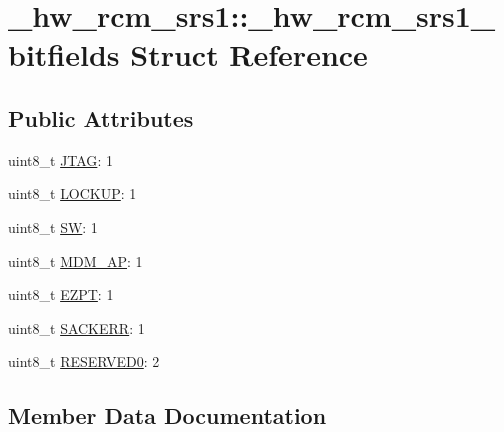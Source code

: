 \hypertarget{struct__hw__rcm__srs1_1_1__hw__rcm__srs1__bitfields}{}\section{\+\_\+hw\+\_\+rcm\+\_\+srs1\+:\+:\+\_\+hw\+\_\+rcm\+\_\+srs1\+\_\+bitfields Struct Reference}
\label{struct__hw__rcm__srs1_1_1__hw__rcm__srs1__bitfields}
\subsection*{Public Attributes}
\begin{DoxyCompactItemize}
\item 
uint8\+\_\+t \hyperlink{struct__hw__rcm__srs1_1_1__hw__rcm__srs1__bitfields_a8804b5c3226e9d934b9993793832d907}{J\+T\+AG}\+: 1
\item 
uint8\+\_\+t \hyperlink{struct__hw__rcm__srs1_1_1__hw__rcm__srs1__bitfields_a63712712ce5d3199b675a6382d48a22b}{L\+O\+C\+K\+UP}\+: 1
\item 
uint8\+\_\+t \hyperlink{struct__hw__rcm__srs1_1_1__hw__rcm__srs1__bitfields_ac8ebd31fe8ce4a05372eb5c9d12124f3}{SW}\+: 1
\item 
uint8\+\_\+t \hyperlink{struct__hw__rcm__srs1_1_1__hw__rcm__srs1__bitfields_aeb4e3db6add5d45ac6194c7bd1617d14}{M\+D\+M\+\_\+\+AP}\+: 1
\item 
uint8\+\_\+t \hyperlink{struct__hw__rcm__srs1_1_1__hw__rcm__srs1__bitfields_a71553c5e402eeb08470ff3e3bf4f08b7}{E\+Z\+PT}\+: 1
\item 
uint8\+\_\+t \hyperlink{struct__hw__rcm__srs1_1_1__hw__rcm__srs1__bitfields_abd4ea56467ab6411c7ae0e4bdb90363c}{S\+A\+C\+K\+E\+RR}\+: 1
\item 
uint8\+\_\+t \hyperlink{struct__hw__rcm__srs1_1_1__hw__rcm__srs1__bitfields_adfeac2fdab49212e6b2fc082bb7e1dc8}{R\+E\+S\+E\+R\+V\+E\+D0}\+: 2
\end{DoxyCompactItemize}


\subsection{Member Data Documentation}
